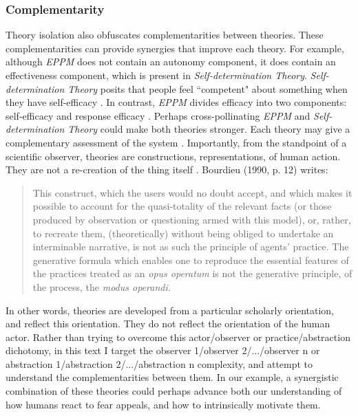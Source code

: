 \documentclass[12 pt]{article}
\begin{document}
 \subsubsection{Complementarity} 
Theory isolation also obfuscates complementarities between theories. These complementarities can provide synergies that improve each theory.  For example, although \textit{EPPM} does not contain an autonomy component, it does contain an effectiveness component, which is present in \textit{Self-determination Theory}. \textit{Self-determination Theory} posits that people feel ``competent" about something when they have self-efficacy \parencite{Ryan2000}. In contrast, \textit{EPPM} divides efficacy into two components: self-efficacy and response efficacy \parencite{Maloney2011}. Perhaps cross-pollinating \textit{EPPM} and \textit{Self-determination Theory} could make both theories stronger. Each theory may give a complementary assessment of the system \parencite{Weinberg2001}. Importantly, from the standpoint of a scientific observer, theories are constructions, representations, of human action. They are not a re-creation of the thing itself \parencite{Kaplan1964, Bourdieu1990}. Bourdieu (1990,  p. 12) writes: \blockquote{This construct, which the users would no doubt accept, and which makes it possible to account for the quasi-totality of the relevant facts (or those produced by observation or questioning armed with this model), or, rather, to recreate them, (theoretically) without being obliged to undertake an interminable narrative, is not as such the principle of agents' practice. The generative formula which enables one to reproduce the essential features of the practices treated as an \textit{opus operatum} is not the generative principle, of the process, the \textit{modus operandi.}}

In other words, theories are developed from a particular scholarly orientation, and reflect this orientation. They do not reflect the orientation of the human actor. Rather than trying to overcome this actor/observer or practice/abstraction  dichotomy, in this text I target the observer 1/observer 2/.../observer n   or abstraction 1/abstraction 2/.../abstraction n complexity, and attempt to understand the complementarities between them. In our example, a synergistic combination of these theories could perhaps advance both our understanding of how humans react to fear appeals, and how to intrinsically motivate them. 
\end{document}
